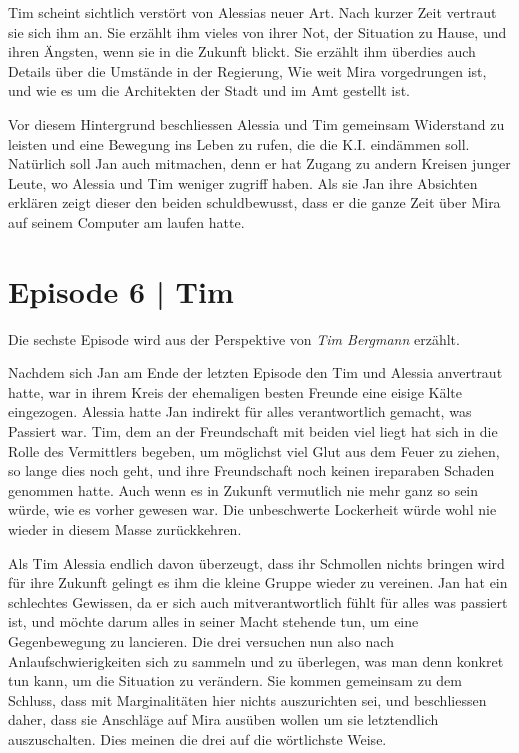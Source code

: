 \documentclass[11pt,a4paper,ngerman]{scrreprt}
\begin{document}
Tim scheint sichtlich verstört von Alessias neuer Art. Nach kurzer Zeit vertraut
sie sich ihm an. Sie erzählt ihm vieles von ihrer Not, der Situation zu Hause,
und ihren Ängsten, wenn sie in die Zukunft blickt. Sie erzählt ihm überdies auch
Details über die Umstände in der Regierung, Wie weit Mira vorgedrungen ist, und
wie es um die Architekten der Stadt und im Amt gestellt ist.

Vor diesem Hintergrund beschliessen Alessia und Tim gemeinsam Widerstand zu
leisten und eine Bewegung ins Leben zu rufen, die die K.I. eindämmen
soll. Natürlich soll Jan auch mitmachen, denn er hat Zugang zu andern Kreisen
junger Leute, wo Alessia und Tim weniger zugriff haben. Als sie Jan ihre
Absichten erklären zeigt dieser den beiden schuldbewusst, dass er die ganze Zeit
über Mira auf seinem Computer am laufen hatte.

\section*{Episode 6 | Tim}

Die sechste Episode wird aus der Perspektive von \emph{Tim Bergmann} erzählt.

Nachdem sich Jan am Ende der letzten Episode den Tim und Alessia anvertraut
hatte, war in ihrem Kreis der ehemaligen besten Freunde eine eisige Kälte
eingezogen. Alessia hatte Jan indirekt für alles verantwortlich gemacht, was
Passiert war. Tim, dem an der Freundschaft mit beiden viel liegt hat sich in die
Rolle des Vermittlers begeben, um möglichst viel Glut aus dem Feuer zu ziehen,
so lange dies noch geht, und ihre Freundschaft noch keinen ireparaben Schaden
genommen hatte. Auch wenn es in Zukunft vermutlich nie mehr ganz so sein würde,
wie es vorher gewesen war. Die unbeschwerte Lockerheit würde wohl nie wieder in
diesem Masse zurückkehren.

Als Tim Alessia endlich davon überzeugt, dass ihr Schmollen nichts bringen wird
für ihre Zukunft gelingt es ihm die kleine Gruppe wieder zu vereinen. Jan hat
ein schlechtes Gewissen, da er sich auch mitverantwortlich fühlt für alles was
passiert ist, und möchte darum alles in seiner Macht stehende tun, um eine
Gegenbewegung zu lancieren. Die drei versuchen nun also nach
Anlaufschwierigkeiten sich zu sammeln und zu überlegen, was man denn konkret tun
kann, um die Situation zu verändern. Sie kommen gemeinsam zu dem Schluss, dass
mit Marginalitäten hier nichts auszurichten sei, und beschliessen daher, dass
sie Anschläge auf Mira ausüben wollen um sie letztendlich auszuschalten. Dies
meinen die drei auf die wörtlichste Weise.
\end{document}
